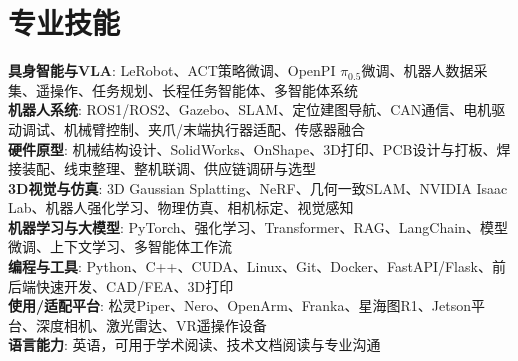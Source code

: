 \documentclass[letterpaper,12pt]{article}
\begin{document}
\section{专业技能}
 \begin{itemize}[leftmargin=0.15in, label={}]
    \small{\item{
     \textbf{具身智能与VLA}{: LeRobot、ACT策略微调、OpenPI $\pi_{0.5}$微调、机器人数据采集、遥操作、任务规划、长程任务智能体、多智能体系统} \\
     \textbf{机器人系统}{: ROS1/ROS2、Gazebo、SLAM、定位建图导航、CAN通信、电机驱动调试、机械臂控制、夹爪/末端执行器适配、传感器融合} \\
     \textbf{硬件原型}{: 机械结构设计、SolidWorks、OnShape、3D打印、PCB设计与打板、焊接装配、线束整理、整机联调、供应链调研与选型} \\
     \textbf{3D视觉与仿真}{: 3D Gaussian Splatting、NeRF、几何一致SLAM、NVIDIA Isaac Lab、机器人强化学习、物理仿真、相机标定、视觉感知} \\
     \textbf{机器学习与大模型}{: PyTorch、强化学习、Transformer、RAG、LangChain、模型微调、上下文学习、多智能体工作流} \\
     \textbf{编程与工具}{: Python、C++、CUDA、Linux、Git、Docker、FastAPI/Flask、前后端快速开发、CAD/FEA、3D打印} \\
     \textbf{使用/适配平台}{: 松灵Piper、Nero、OpenArm、Franka、星海图R1、Jetson平台、深度相机、激光雷达、VR遥操作设备} \\
     \textbf{语言能力}{: 英语，可用于学术阅读、技术文档阅读与专业沟通} \\
    }}
 \end{itemize}
\end{document}
